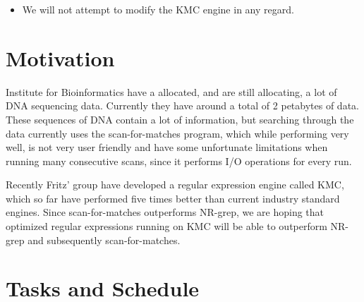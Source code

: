 \documentclass[12pt]{article}
\begin{document}
\begin{itemize}
	\item We will not attempt to modify the KMC engine in any regard.
\end{itemize}

\section{Motivation}

Institute for Bioinformatics have a allocated, and are still allocating, a lot of DNA sequencing data. Currently they have around a total of 2 petabytes of data. These sequences of DNA contain a lot of information, but searching through the data currently uses the scan-for-matches program, which while performing very well, is not very user friendly and have some unfortunate limitations when running many consecutive scans, since it performs I/O operations for every run.

Recently Fritz' group have developed a regular expression engine called KMC, which so far have performed five times better than current industry standard engines. Since scan-for-matches outperforms NR-grep\cite{nrgrep}, we are hoping that optimized regular expressions running on KMC will be able to outperform NR-grep and subsequently scan-for-matches.

\section{Tasks and Schedule}
\end{document}
